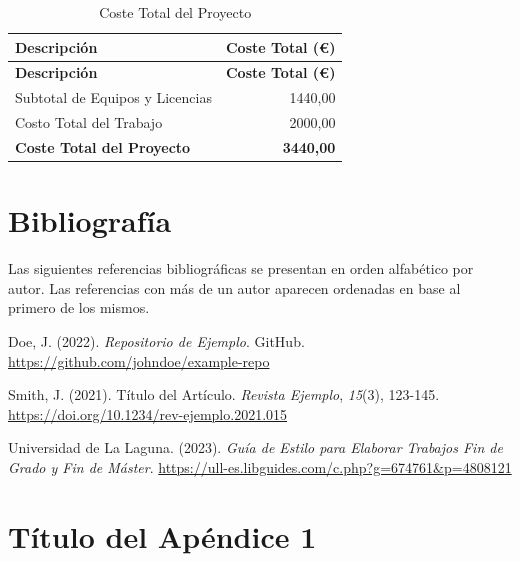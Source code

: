 \documentclass[
  letterpaper,
  DIV=11,
  numbers=noendperiod]{scrreprt}
\newlength{\cslhangindent}
\newenvironment{CSLReferences}[2] %
 {\begin{list}{}{%
  \setlength{\itemindent}{0pt}
  \setlength{\leftmargin}{0pt}
  \setlength{\parsep}{0pt}
  \ifodd #1
   \setlength{\leftmargin}{\cslhangindent}
   \setlength{\itemindent}{-1\cslhangindent}
  \fi
  \setlength{\itemsep}{#2\baselineskip}}}
 {\end{list}}
\begin{document}
\begin{longtable}[]{@{}lr@{}}
\caption{Coste Total del Proyecto}\label{tbl-presupuesto}\tabularnewline
\toprule\noalign{}
\textbf{Descripción} & \textbf{Coste Total (€)} \\
\midrule\noalign{}
\endfirsthead
\toprule\noalign{}
\textbf{Descripción} & \textbf{Coste Total (€)} \\
\midrule\noalign{}
\endhead
\bottomrule\noalign{}
\endlastfoot
Subtotal de Equipos y Licencias & 1440,00 \\
Costo Total del Trabajo & 2000,00 \\
\textbf{Coste Total del Proyecto} & \textbf{3440,00} \\
\end{longtable}


\chapter*{Bibliografía}\label{bibliografuxeda}


Las siguientes referencias bibliográficas se presentan en orden
alfabético por autor. Las referencias con más de un autor aparecen
ordenadas en base al primero de los mismos. \bigskip

\label{refs}
\begin{CSLReferences}{1}{0}
Doe, J. (2022). \emph{Repositorio de Ejemplo}. GitHub.
\url{https://github.com/johndoe/example-repo}

Smith, J. (2021). Título del Artículo. \emph{Revista Ejemplo},
\emph{15}(3), 123-145.
\url{https://doi.org/10.1234/rev-ejemplo.2021.015}

Universidad de La Laguna. (2023). \emph{Guía de Estilo para Elaborar
Trabajos Fin de Grado y Fin de Máster}.
\url{https://ull-es.libguides.com/c.php?g=674761&p=4808121}

\end{CSLReferences}

\cleardoublepage
{}
{}
\appendix

\chapter{Título del Apéndice 1}\label{sec-apendice-uno}
\end{document}
